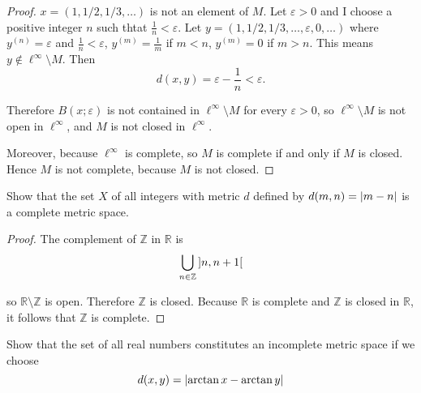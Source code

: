 \begin{proof}
    $x = (1, 1/2, 1/3, \ldots)$ is not an element of $M$. Let $\varepsilon > 0$ and I choose a positive integer $n$ such thtat $\frac{1}{n} < \varepsilon$. Let $y = (1, 1/2, 1/3, \ldots, \varepsilon, 0, \ldots)$ where $y^{(n)} = \varepsilon$ and $\frac{1}{n} < \varepsilon$, $y^{(m)} = \frac{1}{m}$ if $m < n$, $y^{(m)} = 0$ if $m > n$. This means $y\notin \ell^{\infty}\setminus M$. Then
    \[
        d(x, y) = \varepsilon - \frac{1}{n} < \varepsilon.
    \]

    Therefore $B(x; \varepsilon)$ is not contained in $\ell^{\infty}\setminus M$ for every $\varepsilon > 0$, so $\ell^{\infty}\setminus M$ is not open in $\ell^{\infty}$, and $M$ is not closed in $\ell^{\infty}$.

    Moreover, because $\ell^{\infty}$ is complete, so $M$ is complete if and only if $M$ is closed. Hence $M$ is not complete, because $M$ is not closed.
\end{proof}

\begin{exercise}\label{chapter1:section5:exercise5}
    Show that the set $X$ of all integers with metric $d$ defined by $d(m, n) = \left\vert{m - n}\right\vert$ is a complete metric space.
\end{exercise}

\begin{proof}
    The complement of $\mathbb{Z}$ in $\mathbb{R}$ is
    \[
        \bigcup_{n\in\mathbb{Z}}\left]{n, n+1}\right[
    \]

    so $\mathbb{R}\setminus\mathbb{Z}$ is open. Therefore $\mathbb{Z}$ is closed. Because $\mathbb{R}$ is complete and $\mathbb{Z}$ is closed in $\mathbb{R}$, it follows that $\mathbb{Z}$ is complete.
\end{proof}

\begin{exercise}\label{chapter1:section5:exercise6}
    Show that the set of all real numbers constitutes an incomplete metric space if we choose
    \[
        d(x, y) = \left\vert{\arctan x - \arctan y}\right\vert
    \]
\end{exercise}

